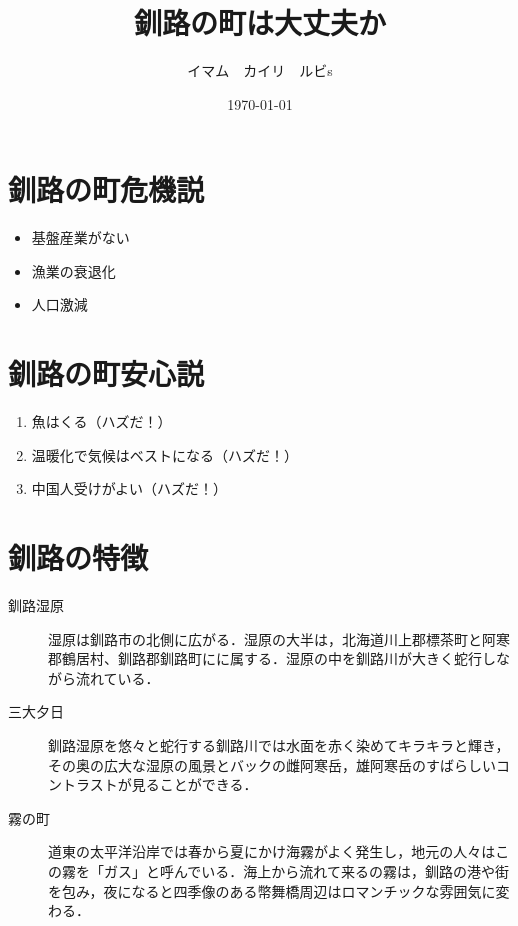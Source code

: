 \documentclass[a4j, twocolumn]{jarticle}
\begin{document}
\title{釧路の町は大丈夫か}
\author{イマム　カイリ　ルビs} 
\date{\today}

\maketitle


\section{釧路の町危機説}

\begin{itemize}
    \item 基盤産業がない
    \item 漁業の衰退化
    \item 人口激減
\end{itemize}


\section{釧路の町安心説}

\begin{enumerate}
    \item 魚はくる（ハズだ！）\cite{bib1}
    \item 温暖化で気候はベストになる（ハズだ！）
    \item 中国人受けがよい（ハズだ！）
\end{enumerate}


\section{釧路の特徴}
\begin{description}
    \item[釧路湿原]
    湿原は釧路市の北側に広がる．湿原の大半は，北海道川上郡標茶町と阿寒郡鶴居村、釧路郡釧路町にに属する．湿原の中を釧路川が大きく蛇行しながら流れている．\cite{bib2}

    \item[三大夕日]
    釧路湿原を悠々と蛇行する釧路川では水面を赤く染めてキラキラと輝き，その奥の広大な湿原の風景とバックの雌阿寒岳，雄阿寒岳のすばらしいコントラストが見ることができる．\cite{bib2}

    \item[霧の町]
    道東の太平洋沿岸では春から夏にかけ海霧がよく発生し，地元の人々はこの霧を「ガス」と呼んでいる．海上から流れて来るの霧は，釧路の港や街を包み，夜になると四季像のある幣舞橋周辺はロマンチックな雰囲気に変わる．\cite{bib2}
\end{description}
\end{document}
